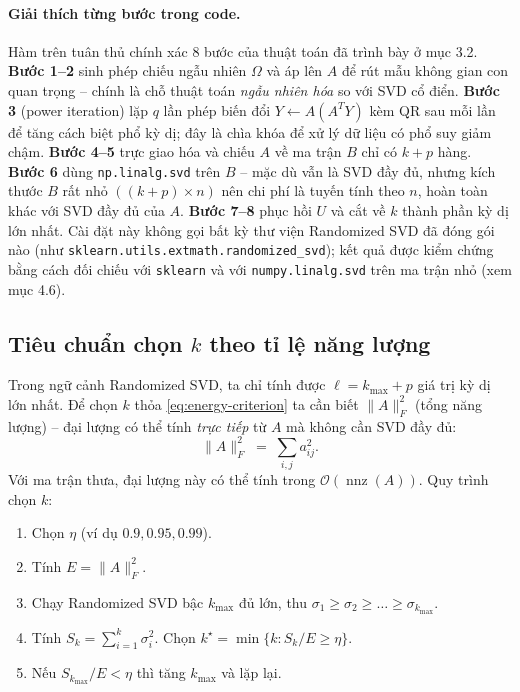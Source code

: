 \paragraph{Giải thích từng bước trong code.}
Hàm trên tuân thủ chính xác $8$ bước của thuật toán đã trình bày ở mục 3.2.
\textbf{Bước 1--2} sinh phép chiếu ngẫu nhiên $\Omega$ và áp lên $A$ để rút mẫu
không gian con quan trọng -- chính là chỗ thuật toán \emph{ngẫu nhiên hóa} so
với SVD cổ điển. \textbf{Bước 3} (power iteration) lặp $q$ lần phép biến đổi
$Y \leftarrow A(A^T Y)$ kèm QR sau mỗi lần để tăng cách biệt phổ kỳ dị; đây là
chìa khóa để xử lý dữ liệu có phổ suy giảm chậm. \textbf{Bước 4--5} trực giao
hóa và chiếu $A$ về ma trận $B$ chỉ có $k+p$ hàng. \textbf{Bước 6} dùng
\texttt{np.linalg.svd} trên $B$ -- mặc dù vẫn là SVD đầy đủ, nhưng kích thước
$B$ rất nhỏ $((k+p)\times n)$ nên chi phí là tuyến tính theo $n$, hoàn toàn
khác với SVD đầy đủ của $A$. \textbf{Bước 7--8} phục hồi $U$ và cắt về $k$
thành phần kỳ dị lớn nhất. Cài đặt này không gọi bất kỳ thư viện Randomized
SVD đã đóng gói nào (như \texttt{sklearn.utils.extmath.randomized\_svd}); kết
quả được kiểm chứng bằng cách đối chiếu với \texttt{sklearn} và với
\texttt{numpy.linalg.svd} trên ma trận nhỏ (xem mục 4.6).

\subsection{Tiêu chuẩn chọn $k$ theo tỉ lệ năng lượng}

Trong ngữ cảnh Randomized SVD, ta chỉ tính được $\ell = k_{\max}+p$ giá trị kỳ dị
lớn nhất. Để chọn $k$ thỏa \eqref{eq:energy-criterion} ta cần biết $\|A\|_F^2$
(tổng năng lượng) -- đại lượng có thể tính \emph{trực tiếp} từ $A$ mà không cần
SVD đầy đủ:
\[
\|A\|_F^2 \;=\; \sum_{i,j} a_{ij}^2.
\]
Với ma trận thưa, đại lượng này có thể tính trong $\mathcal{O}(\operatorname{nnz}(A))$.
Quy trình chọn $k$:
\begin{enumerate}
    \item Chọn $\eta$ (ví dụ $0.9, 0.95, 0.99$).
    \item Tính $E = \|A\|_F^2$.
    \item Chạy Randomized SVD bậc $k_{\max}$ đủ lớn, thu $\sigma_1 \ge \sigma_2 \ge \dots \ge \sigma_{k_{\max}}$.
    \item Tính $S_k = \sum_{i=1}^{k}\sigma_i^2$. Chọn $k^\star = \min\{k : S_k/E \ge \eta\}$.
    \item Nếu $S_{k_{\max}}/E < \eta$ thì tăng $k_{\max}$ và lặp lại.
\end{enumerate}


